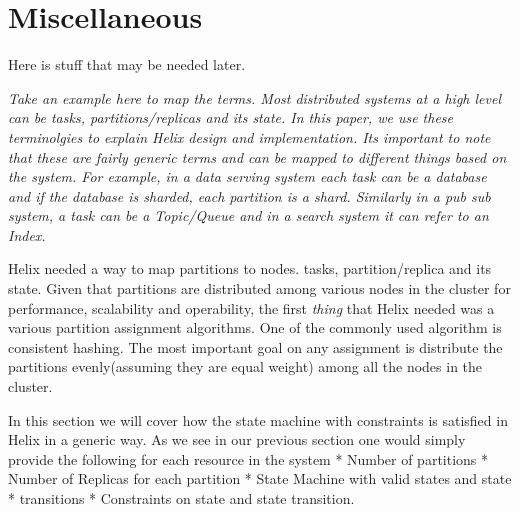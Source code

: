 \section{Miscellaneous}
Here is stuff that may be needed later.


{\em Take an example here to map the terms.  Most distributed systems
at a high level can be tasks, partitions/replicas and its state. In
this paper, we use these terminolgies to explain Helix design and
implementation. Its important to note that these are fairly generic
terms and can be mapped to different things based on the system. For
example, in a data serving system each task can be a database and if
the database is sharded, each partition is a shard. Similarly in a pub
sub system, a task can be a Topic/Queue and in a search system it can
refer to an Index.  }

Helix needed a way to map partitions to nodes.
tasks, partition/replica and its state.
Given that partitions are distributed among various nodes in the
cluster for performance, scalability and operability, the first {\em
  thing} that Helix needed was a various partition assignment algorithms. 
One of the commonly used
algorithm is consistent hashing. The most important goal on any
assignment is distribute the partitions evenly(assuming they are equal
weight) among all the nodes in the cluster.




In this section we will cover how the state
machine with constraints is
satisfied in Helix in a generic way. As we see
in our previous section one would
simply provide the following for each resource
in the system
* Number of partitions
* Number of Replicas for each partition
* State Machine with valid states and state
* transitions
* Constraints on state and state transition.

